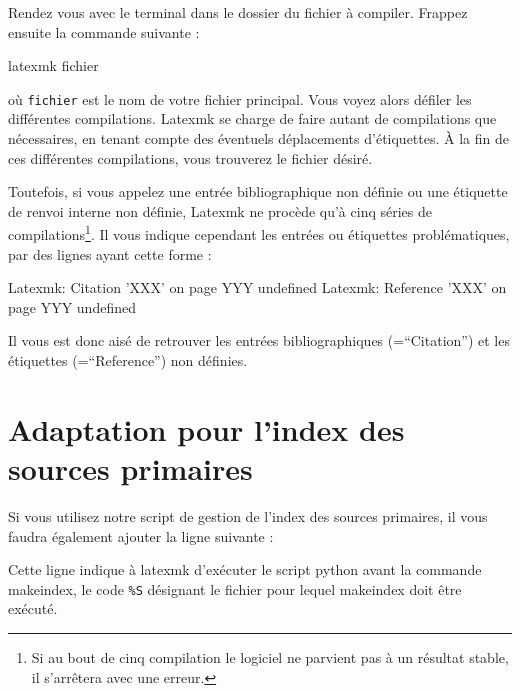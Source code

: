 Rendez vous avec le terminal dans le dossier du fichier à compiler. Frappez ensuite la commande suivante :
\begin{bashcode}
latexmk fichier
\end{bashcode}

où \verb|fichier| est le nom de votre fichier principal. Vous voyez alors défiler les différentes compilations. Latexmk se charge de faire autant de compilations que nécessaires, en tenant compte des éventuels déplacements d'étiquettes. À la fin de ces différentes compilations, vous trouverez le fichier  désiré.

Toutefois, si vous appelez une entrée bibliographique non définie ou une étiquette de renvoi interne non définie, Latexmk ne procède qu'à cinq séries de compilations\footnote{Si au bout de cinq compilation le logiciel ne parvient pas à un résultat stable, il s'arrêtera avec une erreur.}. Il vous indique cependant les entrées ou étiquettes problématiques, par des lignes ayant cette forme :
\begin{bashcode}
Latexmk: Citation 'XXX' on page YYY undefined 
Latexmk: Reference 'XXX' on page YYY undefined 
\end{bashcode}

Il vous est donc aisé de retrouver les entrées bibliographiques (=\enquote{Citation}) et les étiquettes (=\enquote{Reference}) non définies.

\section{Adaptation pour l'index des sources primaires}

Si vous utilisez notre script de gestion de l'index des sources primaires, il vous faudra également ajouter la ligne suivante :

Cette ligne indique à latexmk d'exécuter le script python avant la commande makeindex, le code \verb|%S| désignant le fichier pour lequel makeindex doit être exécuté.
